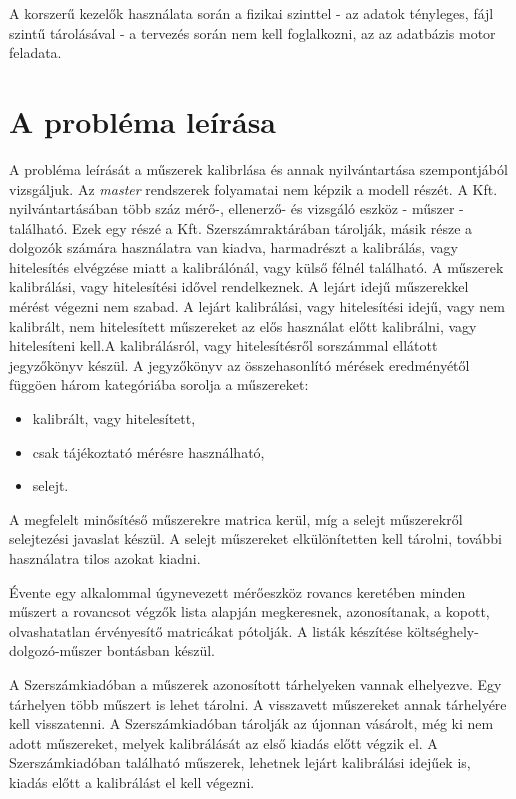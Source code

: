 \documentclass[a4paper,12pt]{report}
\begin{document}
A korszerű kezelők használata során a fizikai szinttel - az adatok tényleges, 
fájl szintű tárolásával - a tervezés során nem kell foglalkozni, az az 
adatbázis motor feladata.



\section{A probléma leírása}
A probléma leírását a műszerek kalibrlása és annak nyilvántartása szempontjából
vizsgáljuk. Az \textit{master} rendszerek folyamatai nem képzik a modell részét.
A Kft. nyilvántartásában több száz mérő-, ellenerző- és vizsgáló eszköz 
- műszer - található. Ezek egy részé a Kft. Szerszámraktárában tárolják, másik 
része a dolgozók számára használatra van kiadva, harmadrészt a kalibrálás, vagy 
hitelesítés elvégzése miatt a kalibrálónál, vagy külső félnél található. 
A műszerek kalibrálási, vagy hitelesítési idővel rendelkeznek. A lejárt idejű 
műszerekkel mérést végezni nem szabad. A lejárt kalibrálási, vagy hitelesítési 
idejű, vagy nem kalibrált, nem hitelesített műszereket az elős 
használat előtt kalibrálni, vagy hitelesíteni kell.A kalibrálásról, vagy 
hitelesítésről sorszámmal ellátott jegyzőkönyv készül. A jegyzőkönyv
az összehasonlító mérések eredményétől függöen három kategóriába sorolja a
műszereket:
\begin{itemize}
 \item kalibrált, vagy hitelesített,
 \item csak tájékoztató mérésre használható,
 \item selejt.
\end{itemize}
A megfelelt minősítéső műszerekre matrica kerül, míg a selejt műszerekről 
selejtezési javaslat készül. A selejt műszereket elkülönítetten kell tárolni, 
további használatra tilos azokat kiadni.
 
Évente egy alkalommal úgynevezett mérőeszköz rovancs keretében minden műszert a 
rovancsot végzők lista alapján megkeresnek, azonosítanak, a kopott, 
olvashatatlan érvényesítő matricákat pótolják. A listák készítése 
költséghely-dolgozó-műszer bontásban készül.
 
A Szerszámkiadóban a műszerek azonosított tárhelyeken vannak elhelyezve. 
Egy tárhelyen több műszert is lehet tárolni. A visszavett műszereket annak 
tárhelyére kell visszatenni. A Szerszámkiadóban tárolják az újonnan vásárolt, 
még ki nem adott műszereket, melyek kalibrálását az első kiadás előtt végzik 
el. A Szerszámkiadóban található műszerek, lehetnek lejárt kalibrálási idejűek 
is, kiadás előtt a kalibrálást el kell végezni.
\end{document}
